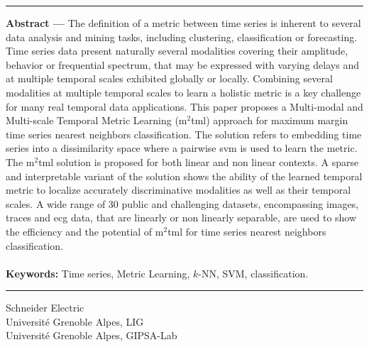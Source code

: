 \begin{vcenterpage}
\noindent\rule[2pt]{\textwidth}{0.5pt}
{\large\textbf{Abstract ---}}
    The definition  of  a metric between time series is inherent to several data analysis and mining tasks, including clustering, classification or forecasting.  Time series  data  present naturally several modalities covering their amplitude, behavior or frequential spectrum, that may be expressed with varying delays and at multiple temporal scales \textemdash exhibited globally or locally.  Combining several modalities at multiple temporal scales to learn a holistic metric is a key challenge for many real temporal data applications.  This paper proposes a Multi-modal and Multi-scale Temporal Metric Learning ({\sc m}$^2${\sc tml}) approach  for maximum margin time series nearest neighbors classification. The solution refers to embedding time series into a dissimilarity space where a pairwise {\sc svm} is used to learn the metric. The {\sc m}$^2${\sc tml}  solution  is proposed for  both linear and non linear contexts. A sparse and interpretable variant of the solution  shows the ability of the learned temporal metric to localize accurately discriminative  modalities as well as their temporal scales. 
    A wide range of 30 public and challenging datasets, encompassing images, traces and {\sc ecg} data, that are  linearly or non linearly separable, are used to show the efficiency and the potential of  {\sc m}$^2${\sc tml} for time series nearest neighbors classification.
\\
\\
{\large\textbf{Keywords:}}
    Time series, Metric Learning, $k$-NN, SVM, classification.
\\
\noindent\rule[2pt]{\textwidth}{0.5pt}
\begin{center}
	Schneider Electric	\\
	Université Grenoble Alpes, LIG\\
	Université Grenoble Alpes, GIPSA-Lab \\
\end{center}
\end{vcenterpage}

